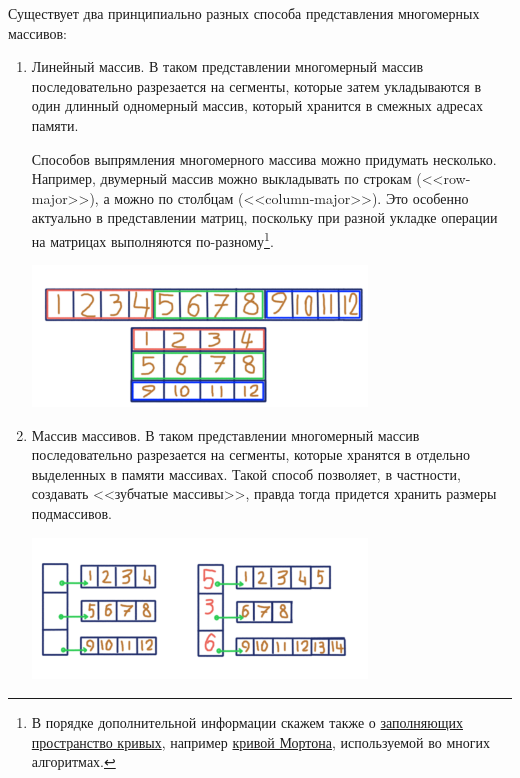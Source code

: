 Существует два принципиально разных способа представления многомерных массивов:
\begin{enumerate}
  \item Линейный массив. В таком представлении многомерный массив последовательно разрезается на сегменты, которые затем
        укладываются в один длинный одномерный массив, который хранится в смежных адресах памяти.
        
        Способов выпрямления многомерного массива можно придумать несколько. Например, двумерный массив можно выкладывать по строкам (<<row-major>>),
        а можно по столбцам (<<column-major>>). Это особенно актуально в представлении матриц, поскольку при разной укладке операции на матрицах
        выполняются по-разному\footnote{В порядке дополнительной информации скажем также о \href{https://en.wikipedia.org/wiki/Space-filling_curve}{заполняющих пространство кривых},
        например \href{https://ru.wikipedia.org/wiki/Кривая_Мортона}{кривой Мортона}, используемой во многих алгоритмах.}.

        \begin{center}
          \includegraphics[width=0.7\textwidth]{resources/15-21/linear_array.png}
        \end{center}

  \item Массив массивов. В таком представлении многомерный массив последовательно разрезается на сегменты, которые хранятся в отдельно выделенных
        в памяти массивах. Такой способ позволяет, в частности, создавать <<зубчатые массивы>>, правда тогда придется хранить размеры подмассивов.

        \begin{center}
          \includegraphics[width=0.7\textwidth]{resources/15-21/array_of_array.png}
        \end{center}
\end{enumerate}

